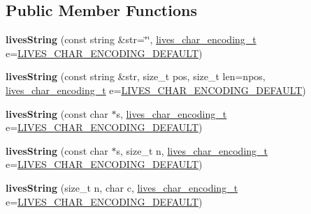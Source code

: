 \subsection*{Public Member Functions}
\begin{DoxyCompactItemize}
\item 
\hypertarget{classlives_1_1livesString_a6819728f52f9a669f71e7dc0a806d0cb}{{\bfseries lives\-String} (const string \&str=\char`\"{}\char`\"{}, \hyperlink{liblives_8hpp_ac7022da9e6d00c731395516feb5dc3e5}{lives\-\_\-char\-\_\-encoding\-\_\-t} e=\hyperlink{liblives_8hpp_aa725ee775f37908fca65f712c202b6c9}{L\-I\-V\-E\-S\-\_\-\-C\-H\-A\-R\-\_\-\-E\-N\-C\-O\-D\-I\-N\-G\-\_\-\-D\-E\-F\-A\-U\-L\-T})}\label{classlives_1_1livesString_a6819728f52f9a669f71e7dc0a806d0cb}

\item 
\hypertarget{classlives_1_1livesString_af81e94452b36a08fc23afb01c0a69aa1}{{\bfseries lives\-String} (const string \&str, size\-\_\-t pos, size\-\_\-t len=npos, \hyperlink{liblives_8hpp_ac7022da9e6d00c731395516feb5dc3e5}{lives\-\_\-char\-\_\-encoding\-\_\-t} e=\hyperlink{liblives_8hpp_aa725ee775f37908fca65f712c202b6c9}{L\-I\-V\-E\-S\-\_\-\-C\-H\-A\-R\-\_\-\-E\-N\-C\-O\-D\-I\-N\-G\-\_\-\-D\-E\-F\-A\-U\-L\-T})}\label{classlives_1_1livesString_af81e94452b36a08fc23afb01c0a69aa1}

\item 
\hypertarget{classlives_1_1livesString_a554abf8380ce3a40b094ab4ee661e7e2}{{\bfseries lives\-String} (const char $\ast$s, \hyperlink{liblives_8hpp_ac7022da9e6d00c731395516feb5dc3e5}{lives\-\_\-char\-\_\-encoding\-\_\-t} e=\hyperlink{liblives_8hpp_aa725ee775f37908fca65f712c202b6c9}{L\-I\-V\-E\-S\-\_\-\-C\-H\-A\-R\-\_\-\-E\-N\-C\-O\-D\-I\-N\-G\-\_\-\-D\-E\-F\-A\-U\-L\-T})}\label{classlives_1_1livesString_a554abf8380ce3a40b094ab4ee661e7e2}

\item 
\hypertarget{classlives_1_1livesString_a05c4d8d63066c7fdf5c5b5e2a80bfeb3}{{\bfseries lives\-String} (const char $\ast$s, size\-\_\-t n, \hyperlink{liblives_8hpp_ac7022da9e6d00c731395516feb5dc3e5}{lives\-\_\-char\-\_\-encoding\-\_\-t} e=\hyperlink{liblives_8hpp_aa725ee775f37908fca65f712c202b6c9}{L\-I\-V\-E\-S\-\_\-\-C\-H\-A\-R\-\_\-\-E\-N\-C\-O\-D\-I\-N\-G\-\_\-\-D\-E\-F\-A\-U\-L\-T})}\label{classlives_1_1livesString_a05c4d8d63066c7fdf5c5b5e2a80bfeb3}

\item 
\hypertarget{classlives_1_1livesString_a6b98bde4fcbac6544f004d9b9ec72ed5}{{\bfseries lives\-String} (size\-\_\-t n, char c, \hyperlink{liblives_8hpp_ac7022da9e6d00c731395516feb5dc3e5}{lives\-\_\-char\-\_\-encoding\-\_\-t} e=\hyperlink{liblives_8hpp_aa725ee775f37908fca65f712c202b6c9}{L\-I\-V\-E\-S\-\_\-\-C\-H\-A\-R\-\_\-\-E\-N\-C\-O\-D\-I\-N\-G\-\_\-\-D\-E\-F\-A\-U\-L\-T})}\label{classlives_1_1livesString_a6b98bde4fcbac6544f004d9b9ec72ed5}


\end{DoxyCompactItemize}
